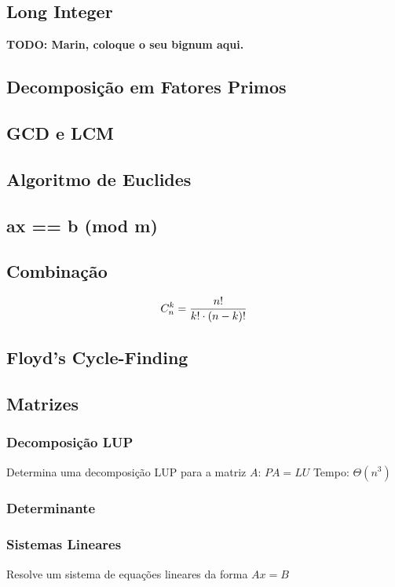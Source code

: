 \documentclass[12pt,a4paper]{article}
\begin{document}
		\subsection{Long Integer}
			\textbf{TODO: Marin, coloque o seu bignum aqui.}
		\subsection{Decomposição em Fatores Primos}
			
		\subsection{GCD e LCM}
			
		\subsection{Algoritmo de Euclides}
			
		\subsection{ax == b (mod m)}
			
		\subsection{Combinação}
			\[ C_n^k = {n! \over {k! \cdot (n - k)!}} \]
			
		\subsection{Floyd's Cycle-Finding}
			
		\subsection{Matrizes}
			\subsubsection{Decomposição LUP}
				Determina uma decomposição LUP para a matriz \(A\): \( PA = LU \)
				Tempo: \( \Theta(n^3) \)
				
			\subsubsection{Determinante}
				
			\subsubsection{Sistemas Lineares}
				Resolve um sistema de equações lineares da forma \(Ax = B\)
				
\end{document}
